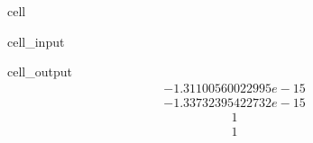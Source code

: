 \documentclass[letterpaper,10pt,english]{jupyterBook}
\begin{document}
\begin{sphinxuseclass}{cell}\begin{sphinxVerbatimInput}

\begin{sphinxuseclass}{cell_input}
\begin{sphinxVerbatim}[commandchars=\\\{\}]

\end{sphinxVerbatim}

\end{sphinxuseclass}\end{sphinxVerbatimInput}
\begin{sphinxVerbatimOutput}

\begin{sphinxuseclass}{cell_output}\begin{equation*}
\begin{split}-1.31100560022995e-15\end{split}
\end{equation*}\begin{equation*}
\begin{split}-1.33732395422732e-15\end{split}
\end{equation*}\begin{equation*}
\begin{split}1\end{split}
\end{equation*}\begin{equation*}
\begin{split}1\end{split}
\end{equation*}
\end{sphinxuseclass}\end{sphinxVerbatimOutput}

\end{sphinxuseclass}
\end{document}

